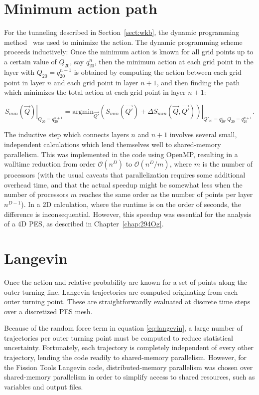\section{Minimum action path}
For the tunneling described in Section~\ref{sect:wkb}, the dynamic programming method~\cite{Baran1981} was used to minimize the action. The dynamic programming scheme proceeds inductively: Once the minimum action is known for all grid points up to a certain value of $Q_{20}$, say $q_{20}^n$, then the minimum action at each grid point in the layer with $Q_{20}=q_{20}^{n+1}$ is obtained by computing the action between each grid point in layer $n$ and each grid point in layer $n+1$, and then finding the path which minimizes the total action at each grid point in layer $n+1$:

\begin{equation}
\left.S_{min}(\vec{Q})\right|_{Q_{20}=q_{20}^{n+1}} = \mathrm{argmin}_{\vec{Q'}}\left.\left(S_{min}(\vec{Q'}) + \Delta S_{min}(\vec{Q},\vec{Q'})\right)\right|_{Q'_{20}=q_{20}^{n}, Q_{20}=q_{20}^{n+1}}.
\end{equation}

The inductive step which connects layers $n$ and $n+1$ involves several small, independent calculations which lend themselves well to shared-memory parallelism. This was implemented in the code using OpenMP, resulting in a walltime reduction from order $\mathcal{O}(n^D)$ to $\mathcal{O}(n^D/m)$, where $m$ is the number of processors (with the usual caveats that parallelization requires some additional overhead time, and that the actual speedup might be somewhat less when the number of processors $m$ reaches the same order as the number of points per layer $n^{D-1}$). In a 2D calculation, where the runtime is on the order of seconds, the difference is inconsequential. However, this speedup was essential for the analysis of a 4D PES, as described in Chapter~\ref{chap:294Og}.


\section{Langevin}
Once the action and relative probability are known for a set of points along the outer turning line, Langevin trajectories are computed originating from each outer turning point. These are straightforwardly evaluated at discrete time steps over a discretized PES mesh.

Because of the random force term in equation \eqref{eq:langevin}, a large number of trajectories per outer turning point must be computed to reduce statistical uncertainty. Fortunately, each trajectory is completely independent of every other trajectory, lending the code readily to shared-memory parallelism. However, for the Fission Tools Langevin code, distributed-memory parallelism was chosen over shared-memory parallelism in order to simplify access to shared resources, such as variables and output files.